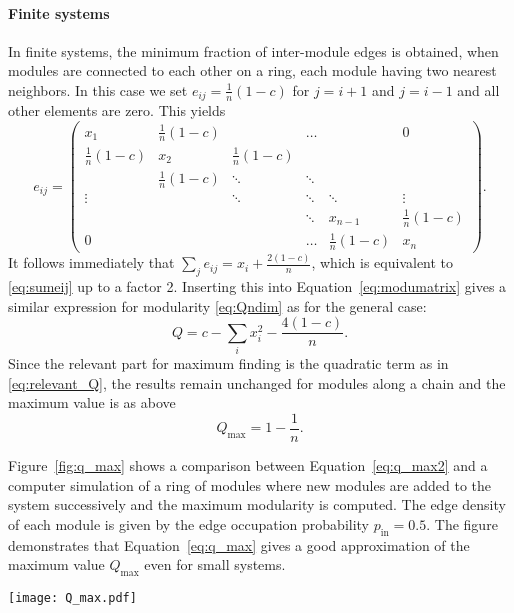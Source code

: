 \paragraph{Finite systems\color{Cayenne}{.}}
In finite systems, the minimum fraction of inter-module edges is obtained, when modules are connected to each other on a ring, each module having two nearest neighbors.
In this case we set  $e_{ij}= \frac{1}{n}(1-c)$ for $j=i+1$ and $j=i-1$ and all other elements are zero.
This yields
\begin{equation}\label{eq:ring_module_matrix}
e_{ij}=\left(\begin{array}{cccccc}
x_1 & \frac{1}{n}(1-c)&  & \hdots &  & 0 \\ 
\frac{1}{n}(1-c)& x_2 &\frac{1}{n}(1-c)&  &  &  \\
 & \frac{1}{n}(1-c) & \ddots & \ddots & & \\
\vdots &  & \ddots & \ddots & \ddots &\vdots \\
 & & & \ddots   &  x_{n-1} &\frac{1}{n}(1-c) \\
0 & &  & \hdots & \frac{1}{n}(1-c) & x_n
\end{array}
\right) .
\end{equation}
It follows immediately that $\sum _j e_{ij}=x_i+\frac{2(1-c)}{n}$, which is equivalent to \eqref{eq:sumeij} up to a factor 2.
Inserting this into Equation~\eqref{eq:modumatrix} gives a similar expression for modularity \eqref{eq:Qndim} as for the general case:
\begin{equation*}
Q=c-\sum _i x_i^2 - \frac{4(1-c)}{n} .
\end{equation*}
Since the relevant part for maximum finding is the quadratic term as in \eqref{eq:relevant_Q}, the results remain unchanged for modules along a chain and the maximum value is as above
\begin{equation}\label{eq:q_max2}
Q_\mathrm{max}=1-\frac{1}{n}.
\end{equation}

Figure~\ref{fig:q_max} shows a comparison between Equation~\eqref{eq:q_max2} and a computer simulation of a ring of modules where new modules are added to the system successively and the maximum modularity is computed. 
The edge density of each module is given by the edge occupation probability $p_\mathrm{in}=0.5$.
The figure demonstrates that Equation~\eqref{eq:q_max} gives a good approximation of the maximum value $Q_\mathrm{max}$ even for small systems.
%
\begin{SCfigure}
\texttt{[image: Q\_max.pdf]}
\caption{Equation \eqref{eq:q_max2} (grey dashed line) reproduces the values found by numerical simulations (red circles).
In the simulations, modules are dense, directed subgraphs ($p_\mathrm{in}=0.5$) with $32$ nodes each.
Modules are connected on a ring so that the resulting graph is connected.
}
\label{fig:q_max}
\end{SCfigure}

